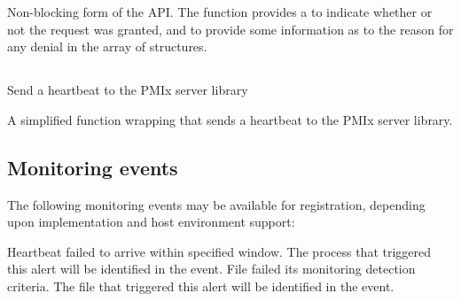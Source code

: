 
\optattrend

\descr

Non-blocking form of the  \ac{API}. The  function provides a  to indicate whether or not the request was granted, and to provide some information as to the reason for any denial in the  array of  structures.

\subsection{}

\summary

Send a heartbeat to the \ac{PMIx} server library

\format



\descr

A simplified function wrapping  that sends a heartbeat to the \ac{PMIx} server library.

\subsection{Monitoring events}
\label{api:struct:events:monitor}

The following monitoring events may be available for registration, depending upon implementation and host environment support:

\begin{constantdesc}
%
Heartbeat failed to arrive within specified window. The process that triggered this alert will be identified in the event.
%
File failed its monitoring detection criteria. The file that triggered this alert will be identified in the event.
%
\end{constantdesc}


